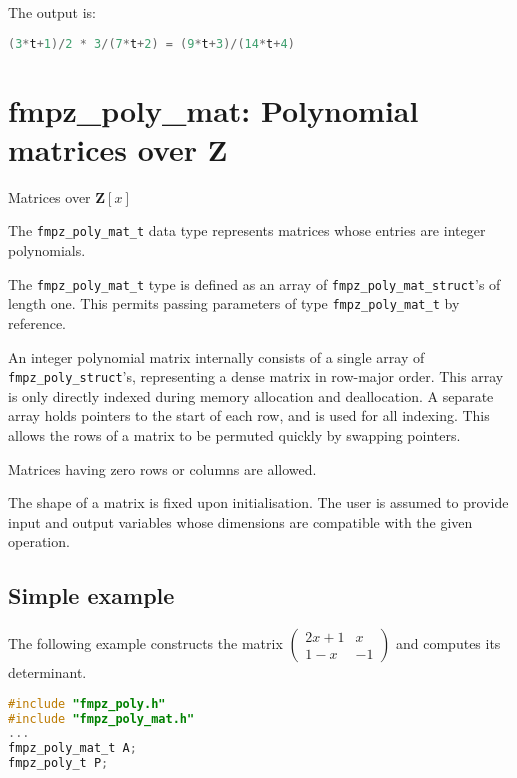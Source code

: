 \documentclass[a4paper,10pt]{book}
\newcommand{\Z}{\mathbf{Z}}%
\newcommand{\code}{\lstinline}
\begin{document}
{{The output is:
\begin{lstlisting}[language=c]
(3*t+1)/2 * 3/(7*t+2) = (9*t+3)/(14*t+4)
\end{lstlisting}




\chapter{fmpz\_poly\_mat: Polynomial matrices over $\Z$}
\epigraph{Matrices over $\mathbf{Z}[x]$}{}

The \code{fmpz_poly_mat_t} data type represents matrices whose
entries are integer polynomials.

The \code{fmpz_poly_mat_t} type is defined as an array of
\code{fmpz_poly_mat_struct}'s of length one.
This  permits passing parameters of type \code{fmpz_poly_mat_t}
by reference.

An integer polynomial matrix internally consists of a single array
of \code{fmpz_poly_struct}'s, representing a dense matrix in
row-major order. This array is only directly indexed
during memory allocation and deallocation. A separate array
holds pointers to the start of each row, and is used for all
indexing. This allows the rows of a matrix to be permuted
quickly by swapping pointers.

Matrices having zero rows or columns are allowed.

The shape of a matrix is fixed upon initialisation.
The user is assumed to provide input and output variables
whose dimensions are compatible with the given operation.

\section{Simple example}

The following example constructs the matrix
$\begin{pmatrix} 2x+1 & x \\ 1-x & -1 \end{pmatrix}$ and computes
its determinant.

\begin{lstlisting}[language=c]
#include "fmpz_poly.h"
#include "fmpz_poly_mat.h"
...
fmpz_poly_mat_t A;
fmpz_poly_t P;


\end{lstlisting}}}
\end{document}
